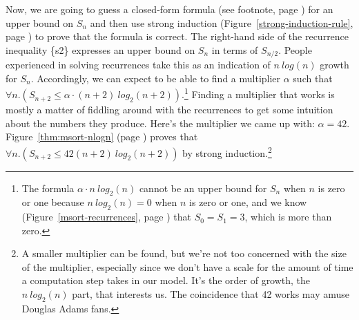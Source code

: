 Now, we are going to guess a closed-form formula
(see footnote, page \pageref{footnote:closed-form})
for an upper bound on $S_n$
and then use strong induction
(Figure~\ref{strong-induction-rule}, page \pageref{strong-induction-rule})
to prove that the formula is correct.
The right-hand side of the recurrence inequality \{s2\} expresses
an upper bound on $S_n$ in terms of $S_{n/2}$.
People experienced in solving recurrences take this as an
indication of $n~log(n)$ growth for $S_n$.
Accordingly, we can expect to be able to find a multiplier $\alpha$ such that
$\forall n.(S_{n+2} \leq \alpha \cdot (n+2)~log_2(n+2))$.\footnote{The
formula $\alpha\cdot n~log_2(n)$ cannot be an upper bound for $S_n$
when $n$ is zero or one because $n~log_2(n) = 0$ when $n$ is zero or one,
and we know
(Figure~\ref{msort-recurrences}, page \pageref{msort-recurrences})
that $S_0 = S_1 = 3$, which is more than zero.}
Finding a multiplier that works is mostly a matter of
fiddling around with the recurrences to get some intuition
about the numbers they produce.
Here's the multiplier we came up with:
$\alpha = 42$.
Figure~\ref{thm:msort-nlogn} (page \pageref{thm:msort-nlogn})
proves that
$\forall n.(S_{n+2} \leq 42(n+2)~log_2(n+2))$
by strong induction.\footnote{A
smaller multiplier can be found, but
we're not too concerned with the size of the multiplier,
especially since we don't have a scale for the amount of time
a computation step takes in our model.
It's the order of growth, the $n~log_2(n)$ part, that interests us.
The coincidence that 42 works may amuse Douglas Adams fans.}

